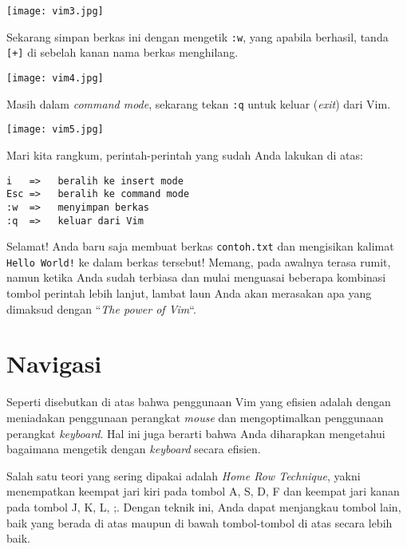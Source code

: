 \documentclass{article}
\begin{document}
\vspace{12pt}

\texttt{[image: vim3.jpg]}

\vspace{12pt}

Sekarang simpan berkas ini dengan mengetik \verb=:w=, yang
apabila berhasil, tanda \verb=[+]= di sebelah kanan nama
berkas menghilang.

\vspace{12pt}

\texttt{[image: vim4.jpg]}

\vspace{12pt}

Masih dalam \emph{command mode}, sekarang tekan \verb=:q=
untuk keluar (\emph{exit}) dari Vim.

\vspace{12pt}

\texttt{[image: vim5.jpg]}

\vspace{12pt}

Mari kita rangkum, perintah-perintah yang sudah Anda lakukan
di atas:

\begin{verbatim}
i   =>   beralih ke insert mode
Esc =>   beralih ke command mode
:w  =>   menyimpan berkas
:q  =>   keluar dari Vim
\end{verbatim}

Selamat! Anda baru saja membuat berkas \verb=contoh.txt= dan
mengisikan kalimat \verb=Hello World!= ke dalam berkas
tersebut! Memang, pada awalnya terasa rumit, namun ketika
Anda sudah terbiasa dan mulai menguasai beberapa kombinasi
tombol perintah lebih lanjut, lambat laun Anda akan merasakan apa
yang dimaksud dengan ``\emph{The power of Vim}``.

\section{Navigasi}
Seperti disebutkan di atas bahwa penggunaan Vim yang efisien
adalah dengan meniadakan penggunaan perangkat \emph{mouse}
dan mengoptimalkan penggunaan perangkat \emph{keyboard}. Hal
ini juga berarti bahwa Anda diharapkan mengetahui bagaimana
mengetik dengan \emph{keyboard} secara efisien. 

Salah satu teori yang sering dipakai adalah \emph{Home Row
Technique}, yakni menempatkan keempat jari kiri pada tombol
A, S, D, F dan keempat jari kanan pada tombol J, K, L, ;.
Dengan teknik ini, Anda dapat menjangkau tombol lain, baik
yang berada di atas maupun di bawah tombol-tombol di atas
secara lebih baik.
\end{document}
